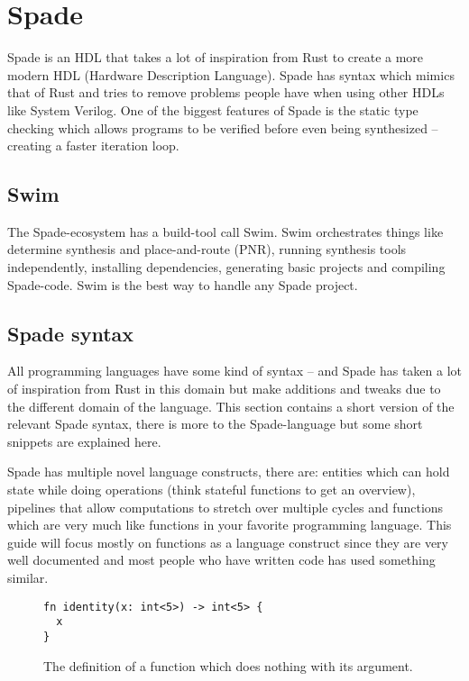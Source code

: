 \section{Spade}
Spade is an HDL that takes a lot of inspiration from Rust to create a more modern HDL (Hardware Description Language). Spade has syntax which mimics that of Rust and tries to remove problems people have when using other HDLs like System Verilog. One of the biggest features of Spade is the static type checking which allows programs to be verified before even being synthesized -- creating a faster iteration loop.
\cite{src:spadeLang,src:spadeSomething,src:spadeAnHDL}

\subsection{Swim}
The Spade-ecosystem has a build-tool call Swim. Swim orchestrates things like determine synthesis and place-and-route (PNR), running synthesis tools independently, installing dependencies, generating basic projects and compiling Spade-code. Swim is the best way to handle any Spade project.

\subsection{Spade syntax}
All programming languages have some kind of syntax -- and Spade has taken a lot of inspiration from Rust in this domain but make additions and tweaks due to the different domain of the language. This section contains a short version of the relevant Spade syntax, there is more to the Spade-language but some short snippets are explained here.

Spade has multiple novel language constructs, there are: entities which can hold state while doing operations (think stateful functions to get an overview), pipelines that allow computations to stretch over multiple cycles and functions which are very much like functions in your favorite programming language. This guide will focus mostly on functions as a language construct since they are very well documented and most people who have written code has used something similar.

\begin{figure}[h!]
\begin{verbatim}
fn identity(x: int<5>) -> int<5> {
  x
}
\end{verbatim}
  \caption{The definition of a function which does nothing with its argument.}
  \label{fig:SpadeExample1}
\end{figure}

